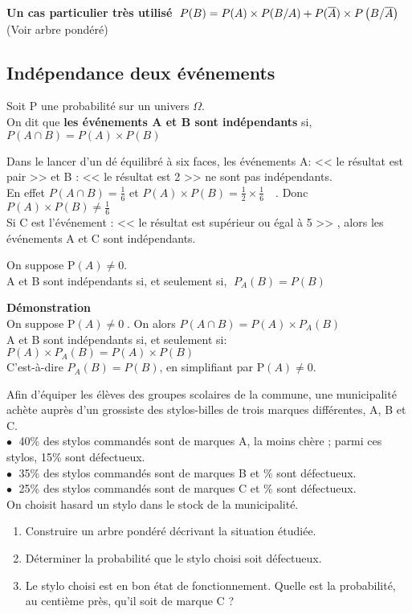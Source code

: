   \textbf{Un cas particulier très utilisé} $ \; P(B) = P(A) \times P(B/A)+P(\overline{A}) \times P\left(B/\overline{A}\right) \; $ (Voir arbre pondéré)
  
  \subsection{Indépendance deux événements}
 \begin{definition}
Soit P une probabilité sur un univers $ \Omega $.\\
On dit que \textbf {les événements A et B sont indépendants} si,\quad 
$ P(A\cap B)= P(A)\times  P(B)$
 \end{definition}
\begin{example}
Dans le lancer d'un dé équilibré à six faces, les événements A: << le résultat est pair >>  et  B : << le résultat est 2 >>   ne sont pas indépendants.\\ En effet $ P(A\cap B)=\frac{1}{6} $\; et \; $P(A)\times  P(B)= \frac{1}{2}\times\frac{1}{6} \quad$.  Donc  $P(A)\times  P(B)\neq \frac{1}{6} $\\
Si C est l'événement : << le résultat est supérieur ou égal à 5 >> , alors les événements A et C sont indépendants.\\
\end{example}
\begin{property}
On suppose  P$ (A)\neq 0 $.\\
 A et B sont indépendants si, et seulement si, $\;P _{A}(B)=P(B) $
\end{property}
\textbf{Démonstration}\\
On suppose   P$ (A)\neq 0 \;$.  On alors  $ P(A\cap B)= P(A)\times  P_{A}(B)$\\
 A et B sont indépendants si, et seulement si:\quad 
 $ P(A)\times  P_{A}(B)= P(A)\times  P(B)$\\ C'est-à-dire $ P_{A}(B)= P(B)$,\; en simplifiant par \;  P$ (A)\neq 0 $.
\begin{exercice}
  Afin d'équiper les élèves des groupes scolaires de la commune, une municipalité achète auprès d'un grossiste des stylos-billes de trois marques différentes, A, B et C.\\
  $ \bullet \; $  40\%  des stylos commandés sont de marques A,  la moins chère ; parmi ces stylos, 15\% sont défectueux.\\
$ \bullet \; $ 35\%  des stylos commandés sont de marques B et \% sont défectueux.\\
 $ \bullet \; $ 25\%  des stylos commandés sont de marques C et \% sont défectueux.\\ On choisit  hasard  un stylo dans le stock de la  municipalité.
  \begin{enumerate}
  \item Construire un arbre pondéré décrivant la situation étudiée.
  \item Déterminer la probabilité que le stylo choisi soit défectueux.
  \item Le stylo choisi est en bon état de fonctionnement.
  Quelle est la probabilité, au centième près, qu'il soit de marque C ?
 \end{enumerate}
\end{exercice}

